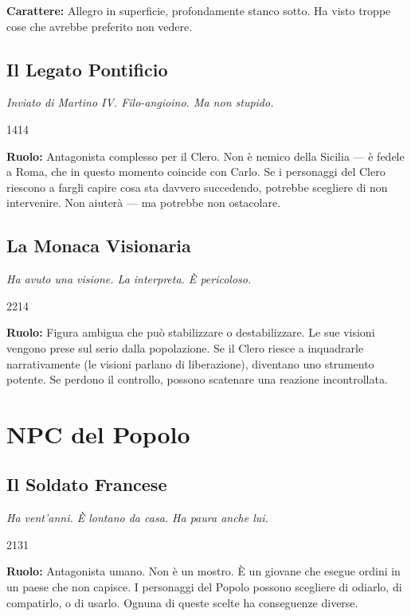 \textbf{Carattere:} Allegro in superficie, profondamente stanco
sotto. Ha visto troppe cose che avrebbe preferito non vedere.

\filetto

\subsection{Il Legato Pontificio}
\textit{Inviato di Martino IV. Filo-angioino. Ma non stupido.}

%
{1}{4}{1}{4}

\textbf{Ruolo:} Antagonista complesso per il Clero. Non è nemico
della Sicilia — è fedele a Roma, che in questo momento coincide
con Carlo. Se i personaggi del Clero riescono a fargli capire
cosa sta davvero succedendo, potrebbe scegliere di non intervenire.
Non aiuterà — ma potrebbe non ostacolare.

\subsection{La Monaca Visionaria}
\textit{Ha avuto una visione. La interpreta. È pericoloso.}

%
{2}{2}{1}{4}

\textbf{Ruolo:} Figura ambigua che può stabilizzare o destabilizzare.
Le sue visioni vengono prese sul serio dalla popolazione. Se il
Clero riesce a inquadrarle narrativamente (le visioni parlano di
liberazione), diventano uno strumento potente. Se perdono il
controllo, possono scatenare una reazione incontrollata.

\secsep

\section{NPC del Popolo}

\subsection{Il Soldato Francese}
\textit{Ha vent'anni. È lontano da casa. Ha paura anche lui.}

%
{2}{1}{3}{1}

\textbf{Ruolo:} Antagonista umano. Non è un mostro. È un giovane
che esegue ordini in un paese che non capisce. I personaggi del
Popolo possono scegliere di odiarlo, di compatirlo, o di usarlo.
Ognuna di queste scelte ha conseguenze diverse.

